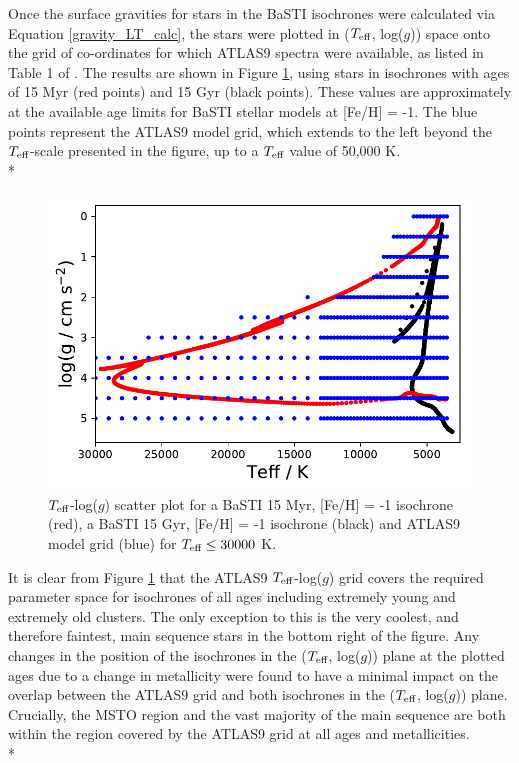 \documentclass[12pt, a4paper]{report}
\begin{document}
Once the surface gravities for stars in the BaSTI isochrones were calculated via Equation \ref{gravity_LT_calc}, the stars were plotted in ($T_{\textnormal{eff}}$, log($g$)) space onto the grid of co-ordinates for which ATLAS9 spectra were available, as listed in Table 1 of \cite{2004astro.ph..5087C}. The results are shown in Figure \ref{Teff-logg coverage}, using stars in isochrones with ages of 15 Myr (red points) and 15 Gyr (black points). These values are approximately at the available age limits for BaSTI stellar models at [Fe/H] = -1. The blue points represent the ATLAS9 model grid, which extends to the left beyond the $T_{\textnormal{eff}}$-scale presented in the figure, up to a $T_{\textnormal{eff}}$ value of 50,000 K.\\*

\begin{figure}[h!]
\begin{center}
\includegraphics[width=1.0\textwidth]{ATLAS9_grid_BaSTI_coverage_2ages_max.pdf}
\caption{$T_{\textnormal{eff}}$-log($g$) scatter plot for a BaSTI 15 Myr, [Fe/H] = -1 isochrone (red), a BaSTI 15 Gyr, [Fe/H] = -1 isochrone (black) and ATLAS9 model grid (blue) for $T_{\textnormal{eff}} \leq 30000$ K.}
\label{Teff-logg coverage}
\end{center}
\end{figure}

It is clear from Figure \ref{Teff-logg coverage} that the ATLAS9 $T_{\textnormal{eff}}$-log($g$) grid covers the required parameter space for isochrones of all ages including extremely young and extremely old clusters. The only exception to this is the very coolest, and therefore faintest, main sequence stars in the bottom right of the figure. Any changes in the position of the isochrones in the ($T_{\textnormal{eff}}$, log($g$)) plane at the plotted ages due to a change in metallicity were found to have a minimal impact on the overlap between the ATLAS9 grid and both isochrones in the ($T_{\textnormal{eff}}$, log($g$)) plane. Crucially, the MSTO region and the vast majority of the main sequence are both within the region covered by the ATLAS9 grid at all ages and metallicities. \\*
\end{document}
